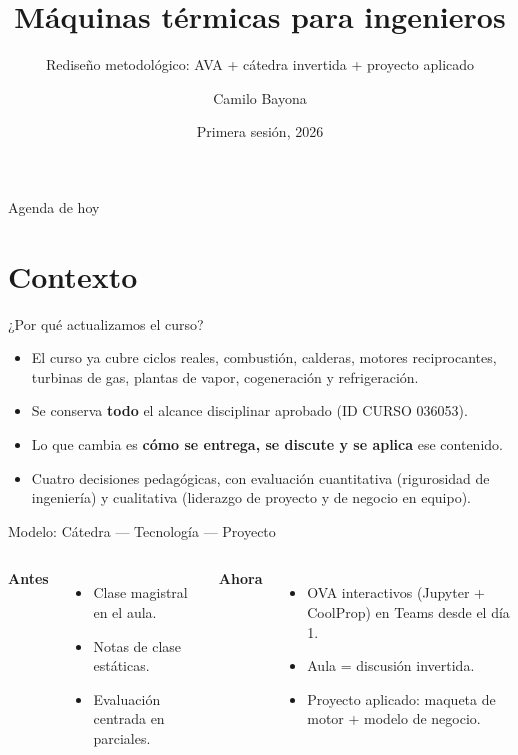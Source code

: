 \documentclass[aspectratio=169]{beamer}
\title[Máquinas Térmicas — Rediseño 2026]{Máquinas térmicas para ingenieros}
\subtitle{Rediseño metodológico: AVA + cátedra invertida + proyecto aplicado}
\author{Camilo Bayona}
\institute[PUJ]{Pontificia Universidad Javeriana \\ Facultad de Ingeniería — Departamento de Ingeniería Industrial}
\date{Primera sesión, 2026}
\begin{document}
\begin{frame}
  \titlepage
\end{frame}

\begin{frame}{Agenda de hoy}
  \tableofcontents
\end{frame}

\section{Contexto}
\begin{frame}{¿Por qué actualizamos el curso?}
  \begin{itemize}
    \item El curso ya cubre ciclos reales, combustión, calderas, motores reciprocantes, turbinas de gas,
      plantas de vapor, cogeneración y refrigeración.
    \item Se conserva \textbf{todo} el alcance disciplinar aprobado (ID CURSO 036053).
    \item Lo que cambia es \textbf{cómo se entrega, se discute y se aplica} ese contenido.
    \item Cuatro decisiones pedagógicas, con evaluación cuantitativa (rigurosidad de ingeniería) y
      cualitativa (liderazgo de proyecto y de negocio en equipo).
  \end{itemize}
\end{frame}

\begin{frame}{Modelo: Cátedra — Tecnología — Proyecto}
  \begin{columns}[T]
      \textbf{Antes}
      \begin{itemize}
        \item Clase magistral en el aula.
        \item Notas de clase estáticas.
        \item Evaluación centrada en parciales.
      \end{itemize}
      \textbf{Ahora}
      \begin{itemize}
        \item OVA interactivos (Jupyter + CoolProp) en Teams desde el día 1.
        \item Aula = discusión invertida.
        \item Proyecto aplicado: maqueta de motor + modelo de negocio.
      \end{itemize}
  \end{columns}
\end{frame}
\end{document}
